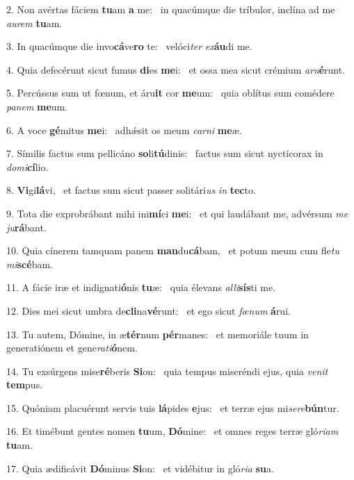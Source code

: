 2. Non avértas fáciem \textbf{tu}am \textbf{a} me: \ast\  in quacúmque die tríbulor, inclína ad me \textit{au}\textit{rem} \textbf{tu}am.\

3. In quacúmque die invo\textbf{cá}ve\textbf{ro} te: \ast\  velóci\textit{ter} \textit{ex}\textbf{áu}di me.\

4. Quia defecérunt sicut fumus \textbf{di}es \textbf{me}i: \ast\  et ossa mea sicut crémium \textit{a}\textit{ru}\textbf{é}runt.\

5. Percússus sum ut fœnum, et áru\textbf{it} cor \textbf{me}um: \ast\  quia oblítus sum comédere \textit{pa}\textit{nem} \textbf{me}um.\

6. A voce \textbf{gé}mitus \textbf{me}i: \ast\  adhǽsit os meum \textit{car}\textit{ni} \textbf{me}æ.\

7. Símilis factus sum pellicáno \textbf{so}li\textbf{tú}dinis: \ast\  factus sum sicut nyctícorax in \textit{do}\textit{mi}\textbf{cí}lio.\

8. \textbf{Vi}gi\textbf{lá}vi, \ast\  et factus sum sicut passer solitári\textit{us} \textit{in} \textbf{tec}to.\

9. Tota die exprobrábant mihi ini\textbf{mí}ci \textbf{me}i: \ast\  et qui laudábant me, advérsum \textit{me} \textit{ju}\textbf{rá}bant.\

10. Quia cínerem tamquam panem \textbf{man}du\textbf{cá}bam, \ast\  et potum meum cum fle\textit{tu} \textit{mi}\textbf{scé}bam.\

11. A fácie iræ et indignati\textbf{ó}nis \textbf{tu}æ: \ast\  quia élevans \textit{al}\textit{li}\textbf{sís}ti me.\

12. Dies mei sicut umbra de\textbf{cli}na\textbf{vé}runt: \ast\  et ego sicut \textit{fœ}\textit{num} \textbf{á}rui.\

13. Tu autem, Dómine, in æ\textbf{tér}num \textbf{pér}manes: \ast\  et memoriále tuum in generatiónem et gene\textit{ra}\textit{ti}\textbf{ó}nem.\

14. Tu exsúrgens mise\textbf{ré}beris \textbf{Si}on: \ast\  quia tempus miseréndi ejus, quia \textit{ve}\textit{nit} \textbf{tem}pus.\

15. Quóniam placuérunt servis tuis \textbf{lá}pides \textbf{e}jus: \ast\  et terræ ejus mi\textit{se}\textit{re}\textbf{bún}tur.\

16. Et timébunt gentes nomen \textbf{tu}um, \textbf{Dó}mine: \ast\  et omnes reges terræ gló\textit{ri}\textit{am} \textbf{tu}am.\

17. Quia ædificávit \textbf{Dó}minus \textbf{Si}on: \ast\  et vidébitur in gló\textit{ri}\textit{a} \textbf{su}a.\

